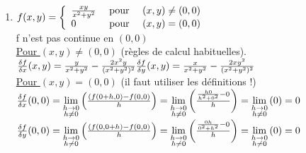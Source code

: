 \documentclass[12pt,a4paper]{article}
\begin{document}
\begin{enumerate}[resume]
	\item 	$f(x,y) = \left\{\begin{array}{lll}
			\frac{xy}{x^2+y^2} & \mbox{ pour } & (x,y) \neq (0,0)\\
			0 & \mbox{ pour } & (x,y) = (0,0)
			\end{array}\right.$\\
			f n'est pas continue en $(0,0)$	\\
			\underline{Pour $(x,y) \neq (0,0)$} (règles de calcul habituelles).\\
			$\frac{\delta f}{\delta x}(x,y) = \frac{y}{x^2+y^2} - \frac{2x^2y}{(x^2+y^2)^2}\\
			\frac{\delta f}{\delta y}(x,y)  = \frac{x}{x^2+y^2} - \frac{2xy^2}{(x^2+y^2)^2}$\\
			\underline{Pour $(x,y) = (0,0)$} (il faut utiliser les définitions !)\\
			$\frac{\delta f}{\delta x} (0,0) = \lim\limits_{\substack{h\to 0 \\ h\neq 0}}\left(\frac{(f(0+h, 0) - f(0,0)}{h}\right) = \lim\limits_{\substack{h\to 0 \\ h\neq 0}}\left(\frac{\frac{h0}{h^2+0^2} -0}{h}\right) = \lim\limits_{\substack{h\to 0 \\ h\neq 0}}\left(0\right) = 0$\\
			$\frac{\delta f}{\delta y} (0,0) = \lim\limits_{\substack{h\to 0 \\ h\neq 0}}\left(\frac{(f(0, 0+h) - f(0,0)}{h}\right) = \lim\limits_{\substack{h\to 0 \\ h\neq 0}}\left(\frac{\frac{0h}{0^2+h^2} -0}{h}\right) = \lim\limits_{\substack{h\to 0 \\ h\neq 0}}\left(0\right) = 0$
\end{enumerate}
\end{document}
